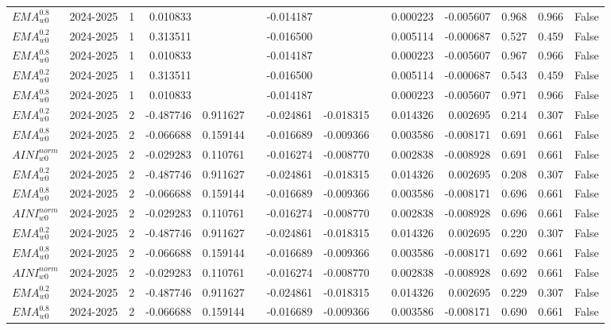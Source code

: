 \begin{tabular}{@{}llrrrrrrrrrlll@{}}
$EMA^{0.8}_{w0}$ & 2024-2025 & 1 & 0.010833 &  &  & -0.014187 &  &  & 0.000223 & -0.005607 & 0.968 & 0.966 & False \\
$EMA^{0.2}_{w0}$ & 2024-2025 & 1 & 0.313511 &  &  & -0.016500 &  &  & 0.005114 & -0.000687 & 0.527 & 0.459 & False \\
$EMA^{0.8}_{w0}$ & 2024-2025 & 1 & 0.010833 &  &  & -0.014187 &  &  & 0.000223 & -0.005607 & 0.967 & 0.966 & False \\
$EMA^{0.2}_{w0}$ & 2024-2025 & 1 & 0.313511 &  &  & -0.016500 &  &  & 0.005114 & -0.000687 & 0.543 & 0.459 & False \\
$EMA^{0.8}_{w0}$ & 2024-2025 & 1 & 0.010833 &  &  & -0.014187 &  &  & 0.000223 & -0.005607 & 0.971 & 0.966 & False \\
$EMA^{0.2}_{w0}$ & 2024-2025 & 2 & -0.487746 & 0.911627 &  & -0.024861 & -0.018315 &  & 0.014326 & 0.002695 & 0.214 & 0.307 & False \\
$EMA^{0.8}_{w0}$ & 2024-2025 & 2 & -0.066688 & 0.159144 &  & -0.016689 & -0.009366 &  & 0.003586 & -0.008171 & 0.691 & 0.661 & False \\
$AINI^{norm}_{w0}$ & 2024-2025 & 2 & -0.029283 & 0.110761 &  & -0.016274 & -0.008770 &  & 0.002838 & -0.008928 & 0.691 & 0.661 & False \\
$EMA^{0.2}_{w0}$ & 2024-2025 & 2 & -0.487746 & 0.911627 &  & -0.024861 & -0.018315 &  & 0.014326 & 0.002695 & 0.208 & 0.307 & False \\
$EMA^{0.8}_{w0}$ & 2024-2025 & 2 & -0.066688 & 0.159144 &  & -0.016689 & -0.009366 &  & 0.003586 & -0.008171 & 0.696 & 0.661 & False \\
$AINI^{norm}_{w0}$ & 2024-2025 & 2 & -0.029283 & 0.110761 &  & -0.016274 & -0.008770 &  & 0.002838 & -0.008928 & 0.696 & 0.661 & False \\
$EMA^{0.2}_{w0}$ & 2024-2025 & 2 & -0.487746 & 0.911627 &  & -0.024861 & -0.018315 &  & 0.014326 & 0.002695 & 0.220 & 0.307 & False \\
$EMA^{0.8}_{w0}$ & 2024-2025 & 2 & -0.066688 & 0.159144 &  & -0.016689 & -0.009366 &  & 0.003586 & -0.008171 & 0.692 & 0.661 & False \\
$AINI^{norm}_{w0}$ & 2024-2025 & 2 & -0.029283 & 0.110761 &  & -0.016274 & -0.008770 &  & 0.002838 & -0.008928 & 0.692 & 0.661 & False \\
$EMA^{0.2}_{w0}$ & 2024-2025 & 2 & -0.487746 & 0.911627 &  & -0.024861 & -0.018315 &  & 0.014326 & 0.002695 & 0.229 & 0.307 & False \\
$EMA^{0.8}_{w0}$ & 2024-2025 & 2 & -0.066688 & 0.159144 &  & -0.016689 & -0.009366 &  & 0.003586 & -0.008171 & 0.690 & 0.661 & False \\

\end{tabular}
